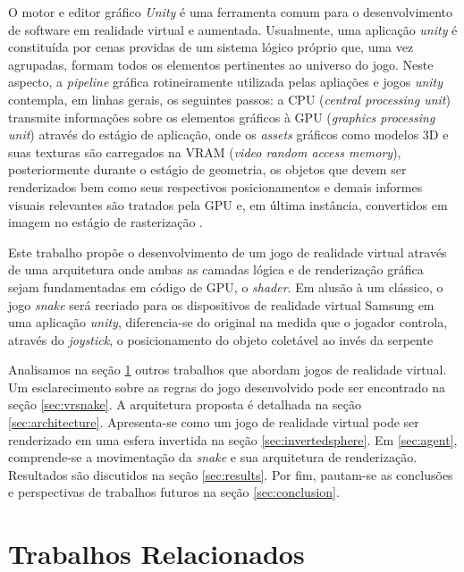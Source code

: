 \documentclass[conference]{IEEEtran}
\begin{document}
O motor e editor gráfico \textit{Unity} é uma ferramenta comum para o desenvolvimento de software em realidade virtual e aumentada. Usualmente, uma aplicação \textit{unity} é constituída por cenas providas de um sistema lógico próprio que, uma vez agrupadas, formam todos os elementos pertinentes ao universo do jogo. Neste aspecto, a \textit{pipeline} gráfica rotineiramente utilizada pelas apliações e jogos \textit{unity} contempla, em linhas gerais, os seguintes passos:  a CPU (\textit{central processing unit}) transmite informações sobre os elementos gráficos à GPU (\textit{graphics processing unit}) através do estágio de aplicação, onde os \textit{assets} gráficos como modelos 3D e suas texturas são carregados na VRAM (\textit{video random access memory}), posteriormente durante o estágio de geometria, os objetos que devem ser renderizados bem como seus respectivos posicionamentos e demais informes visuais relevantes são tratados pela GPU e, em última instância, convertidos em imagem no estágio de rasterização \cite{akenine2008real}.

Este trabalho propõe o desenvolvimento de um jogo de realidade virtual através de uma arquitetura onde ambas as camadas lógica e de renderização gráfica sejam fundamentadas em código de GPU, o \textit{shader}. Em alusão à um clássico, o jogo \textit{snake} será recriado para os dispositivos de realidade virtual Samsung em uma aplicação \textit{unity}, diferencia-se do original na medida que o jogador controla, através do \textit{joystick}, o posicionamento do objeto coletável ao invés da serpente

Analisamos na seção \ref{sec:relatedworks} outros trabalhos que abordam jogos de realidade virtual. Um esclarecimento sobre as regras do jogo desenvolvido pode ser encontrado na seção \ref{sec:vrsnake}. A arquitetura proposta é detalhada na seção \ref{sec:architecture}. Apresenta-se como um jogo de realidade virtual pode ser renderizado em uma esfera invertida na seção \ref{sec:invertedsphere}. Em \ref{sec:agent}, comprende-se a movimentação da \textit{snake} e sua arquitetura de renderização. Resultados são discutidos na seção \ref{sec:results}. Por fim, pautam-se as conclusões e perspectivas de trabalhos futuros na seção \ref{sec:conclusion}.

\section{Trabalhos Relacionados} \label{sec:relatedworks}
\end{document}
